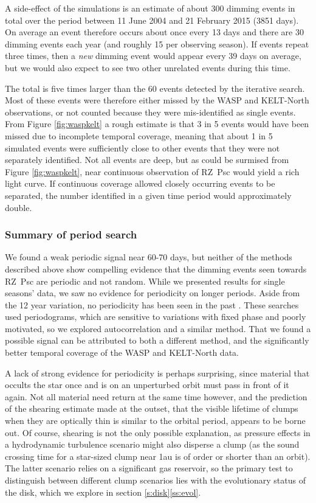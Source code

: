 \documentclass[]{rsos}
\begin{document}
A side-effect of the simulations is an estimate of about 300 dimming events in total over
the period between 11 June 2004 and 21 February 2015 (3851 days). On average an event
therefore occurs about once every 13 days and there are 30 dimming events each year (and
roughly 15 per observing season). If events repeat three times, then a \emph{new} dimming
event would appear every 39 days on average, but we would also expect to see two other
unrelated events during this time.

The total is five times larger than the 60 events detected by the iterative search. Most
of these events were therefore either missed by the WASP and KELT-North observations, or
not counted because they were mis-identified as single events. From Figure
\ref{fig:waspkelt} a rough estimate is that 3 in 5 events would have been missed due to
incomplete temporal coverage, meaning that about 1 in 5 simulated events were
sufficiently close to other events that they were not separately identified. Not all
events are deep, but as could be surmised from Figure \ref{fig:waspkelt}, near continuous
observation of RZ~Psc would yield a rich light curve. If continuous coverage allowed
closely occurring events to be separated, the number identified in a given time period
would approximately double.

\subsubsection{Summary of period search}\label{sss:persum}

We found a weak periodic signal near 60-70 days, but neither of the methods described
above show compelling evidence that the dimming events seen towards RZ~Psc are periodic
and not random. While we presented results for single seasons' data, we saw no evidence
for periodicity on longer periods. Aside from the 12 year variation, no periodicity has
been seen in the past \cite{2013A&A...553L...1D}. These searches used periodograms,
which are sensitive to variations with fixed phase and poorly motivated, so we explored
autocorrelation and a similar method. That we found a possible signal can be attributed
to both a different method, and the significantly better temporal coverage of the WASP
and KELT-North data.

A lack of strong evidence for periodicity is perhaps surprising, since material that
occults the star once and is on an unperturbed orbit must pass in front of it again. Not
all material need return at the same time however, and the prediction of the shearing
estimate made at the outset, that the visible lifetime of clumps when they are optically
thin is similar to the orbital period, appears to be borne out. Of course, shearing is
not the only possible explanation, as pressure effects in a hydrodynamic turbulence
scenario might also disperse a clump (as the sound crossing time for a star-sized clump
near 1au is of order or shorter than an orbit). The latter scenario relies on a
significant gas reservoir, so the primary test to distinguish between different clump
scenarios lies with the evolutionary status of the disk, which we explore in section
\ref{s:disk}\ref{ss:evol}.
\end{document}
